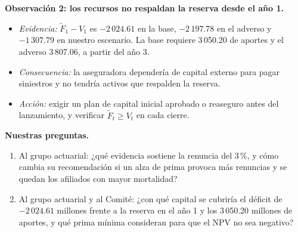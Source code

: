 \documentclass[10pt,a4paper]{article}
\begin{document}
	\medskip
	\noindent\textbf{Observación 2: los recursos no respaldan la reserva desde el año 1.}
	\begin{itemize}
		\item \textit{Evidencia:} \(\widetilde F_1-V_1\) es \(-2\,024.61\) en la base, \(-2\,197.78\) en el adverso y \(-1\,307.79\) en nuestro escenario. La base requiere 3\,050.20 de aportes y el adverso 3\,807.06, a partir del año 3.
		\item \textit{Consecuencia:} la aseguradora dependería de capital externo para pagar siniestros y no tendría activos que respalden la reserva.
		\item \textit{Acción:} exigir un plan de capital inicial aprobado o reaseguro antes del lanzamiento, y verificar \(\widetilde F_t\ge V_t\) en cada cierre.
	\end{itemize}

	\medskip
	\noindent\textbf{Nuestras preguntas.}
	\begin{enumerate}
		\item Al grupo actuarial: ¿qué evidencia sostiene la renuncia del 3\,\%, y cómo cambia su recomendación si un alza de prima provoca más renuncias y se quedan los afiliados con mayor mortalidad?
		\item Al grupo actuarial y al Comité: ¿con qué capital se cubriría el déficit de \(-2\,024.61\) millones frente a la reserva en el año 1 y los 3\,050.20 millones de aportes, y qué prima mínima consideran para que el NPV no sea negativo?
	\end{enumerate}

	\medskip
	\begin{center}
	\end{center}
\end{document}
